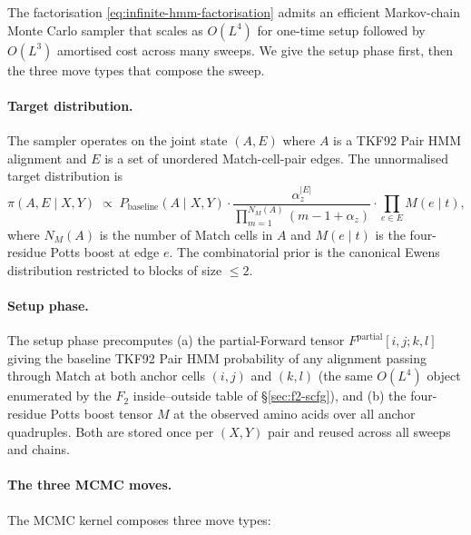 The factorisation \eqref{eq:infinite-hmm-factorisation} admits an
efficient Markov-chain Monte Carlo sampler that scales as $O(L^4)$
for one-time setup followed by $O(L^3)$ amortised cost across many
sweeps. We give the setup phase first, then the three move types
that compose the sweep.

\paragraph{Target distribution.} The sampler operates on the joint
state $(A, E)$ where $A$ is a TKF92 Pair HMM alignment and $E$ is
a set of unordered Match-cell-pair edges. The unnormalised target
distribution is
\begin{equation}
\label{eq:mcmc-target}
\pi(A, E \mid X, Y) \;\propto\; P_{\mathrm{baseline}}(A \mid X, Y) \cdot \frac{\alpha_z^{|E|}}{\prod_{m=1}^{N_M(A)} (m - 1 + \alpha_z)} \cdot \prod_{e \in E} M(e \mid t),
\end{equation}
where $N_M(A)$ is the number of Match cells in $A$ and
$M(e \mid t)$ is the four-residue Potts boost at edge $e$. The
combinatorial prior is the canonical Ewens distribution restricted
to blocks of size $\leq 2$.

\paragraph{Setup phase.} The setup phase precomputes (a) the
partial-Forward tensor $F^{\mathrm{partial}}[i, j; k, l]$ giving
the baseline TKF92 Pair HMM probability of any alignment passing
through Match at both anchor cells $(i, j)$ and $(k, l)$ (the
same $O(L^4)$ object enumerated by the $F_2$ inside--outside
table of \S\ref{sec:f2-scfg}), and (b) the four-residue Potts
boost tensor $M$ at the observed amino acids over all anchor
quadruples. Both are stored once per $(X, Y)$ pair and reused
across all sweeps and chains.

\paragraph{The three MCMC moves.} The MCMC kernel composes three
move types:

